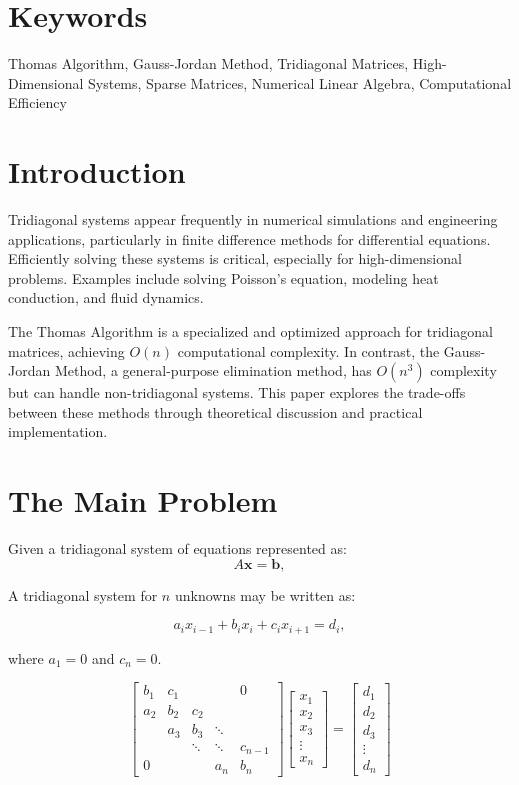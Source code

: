 \documentclass[a4paper,12pt]{article}
\begin{document}
\section*{Keywords}
Thomas Algorithm, Gauss-Jordan Method, Tridiagonal Matrices, High-Dimensional Systems, Sparse Matrices, Numerical Linear Algebra, Computational Efficiency

\section*{Introduction}
Tridiagonal systems appear frequently in numerical simulations and engineering applications, particularly in finite difference methods for differential equations. Efficiently solving these systems is critical, especially for high-dimensional problems. Examples include solving Poisson's equation, modeling heat conduction, and fluid dynamics.

The Thomas Algorithm is a specialized and optimized approach for tridiagonal matrices, achieving \(O(n)\) computational complexity. In contrast, the Gauss-Jordan Method, a general-purpose elimination method, has \(O(n^3)\) complexity but can handle non-tridiagonal systems. This paper explores the trade-offs between these methods through theoretical discussion and practical implementation.

\newpage
\section*{The Main Problem}
Given a tridiagonal system of equations represented as:
\[
A \mathbf{x} = \mathbf{b},
\]

A tridiagonal system for \( n \) unknowns may be written as:

\[
a_i x_{i-1} + b_i x_i + c_i x_{i+1} = d_i,
\]

where \( a_1 = 0 \) and \( c_n = 0 \).

\[
\begin{bmatrix}
b_{1} & c_{1} & & & 0 \\
a_{2} & b_{2} & c_{2} & & \\
& a_{3} & b_{3} & \ddots & \\
& & \ddots & \ddots & c_{n-1} \\
0 & & & a_{n} & b_{n}
\end{bmatrix}
\begin{bmatrix}
x_{1} \\ x_{2} \\ x_{3} \\ \vdots \\ x_{n}
\end{bmatrix}
=
\begin{bmatrix}
d_{1} \\ d_{2} \\ d_{3} \\ \vdots \\ d_{n}
\end{bmatrix}
\]
\end{document}
